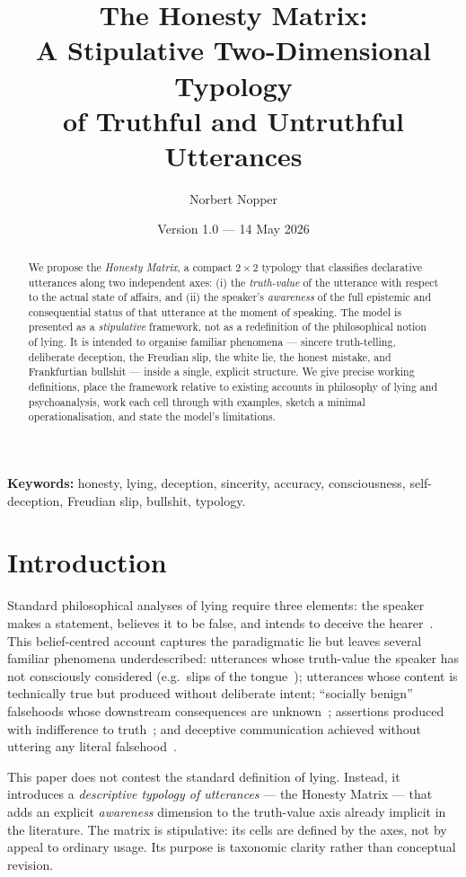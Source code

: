 \documentclass[11pt,a4paper]{article}
\title{The Honesty Matrix:\\A Stipulative Two-Dimensional Typology\\of Truthful and Untruthful Utterances}
\author{Norbert Nopper}
\date{Version 1.0 --- 14 May 2026}
\begin{document}
\maketitle

\begin{abstract}
\noindent
We propose the \emph{Honesty Matrix}, a compact $2\times 2$ typology that
classifies declarative utterances along two independent axes: (i) the
\emph{truth-value} of the utterance with respect to the actual state of
affairs, and (ii) the speaker's \emph{awareness} of the full epistemic and
consequential status of that utterance at the moment of speaking. The
model is presented as a \emph{stipulative} framework, not as a
redefinition of the philosophical notion of lying. It is intended to
organise familiar phenomena --- sincere truth-telling, deliberate
deception, the Freudian slip, the white lie, the honest mistake, and
Frankfurtian bullshit --- inside a single, explicit structure. We give
precise working definitions, place the framework relative to existing
accounts in philosophy of lying and psychoanalysis, work each cell
through with examples, sketch a minimal operationalisation, and state
the model's limitations.
\end{abstract}

\noindent\textbf{Keywords:} honesty, lying, deception, sincerity,
accuracy, consciousness, self-deception, Freudian slip, bullshit,
typology.

\section{Introduction}

Standard philosophical analyses of lying require three elements: the
speaker makes a statement, believes it to be false, and intends to
deceive the hearer~\cite{augustine,bok1978,mahon2016sep,carson2010}. This
belief-centred account captures the paradigmatic lie but leaves several
familiar phenomena underdescribed: utterances whose truth-value the
speaker has not consciously considered (e.g.\ slips of the
tongue~\cite{freud1901}); utterances whose content is technically true
but produced without deliberate intent; ``socially benign'' falsehoods
whose downstream consequences are unknown~\cite{bok1978}; assertions
produced with indifference to truth~\cite{frankfurt2005}; and deceptive
communication achieved without uttering any literal
falsehood~\cite{saul2012,grice1975}.

This paper does not contest the standard definition of lying. Instead,
it introduces a \emph{descriptive typology of utterances} --- the
Honesty Matrix --- that adds an explicit \emph{awareness} dimension to
the truth-value axis already implicit in the literature. The matrix is
stipulative: its cells are defined by the axes, not by appeal to
ordinary usage. Its purpose is taxonomic clarity rather than conceptual
revision.
\end{document}
